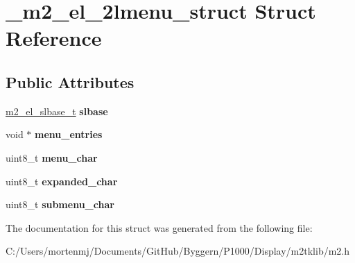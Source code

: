 \hypertarget{struct__m2__el__2lmenu__struct}{\section{\-\_\-m2\-\_\-el\-\_\-2lmenu\-\_\-struct Struct Reference}
\label{struct__m2__el__2lmenu__struct}
}
\subsection*{Public Attributes}
\begin{DoxyCompactItemize}
\item 
\hypertarget{struct__m2__el__2lmenu__struct_a7527f05edbb17b7123e9968b55d26a96}{\hyperlink{struct__m2__el__slbase__struct}{m2\-\_\-el\-\_\-slbase\-\_\-t} {\bfseries slbase}}\label{struct__m2__el__2lmenu__struct_a7527f05edbb17b7123e9968b55d26a96}

\item 
\hypertarget{struct__m2__el__2lmenu__struct_a672420cd13ced182cf71e64004835190}{void $\ast$ {\bfseries menu\-\_\-entries}}\label{struct__m2__el__2lmenu__struct_a672420cd13ced182cf71e64004835190}

\item 
\hypertarget{struct__m2__el__2lmenu__struct_a2bb9ab8547b38e3c5fcf4b228266c040}{uint8\-\_\-t {\bfseries menu\-\_\-char}}\label{struct__m2__el__2lmenu__struct_a2bb9ab8547b38e3c5fcf4b228266c040}

\item 
\hypertarget{struct__m2__el__2lmenu__struct_a315e66f67d3a53d0731a0de873a58a0d}{uint8\-\_\-t {\bfseries expanded\-\_\-char}}\label{struct__m2__el__2lmenu__struct_a315e66f67d3a53d0731a0de873a58a0d}

\item 
\hypertarget{struct__m2__el__2lmenu__struct_a5ae246bdece9e449a68cf91f986ec93f}{uint8\-\_\-t {\bfseries submenu\-\_\-char}}\label{struct__m2__el__2lmenu__struct_a5ae246bdece9e449a68cf91f986ec93f}

\end{DoxyCompactItemize}


The documentation for this struct was generated from the following file\-:\begin{DoxyCompactItemize}
\item 
C\-:/\-Users/mortenmj/\-Documents/\-Git\-Hub/\-Byggern/\-P1000/\-Display/m2tklib/m2.\-h\end{DoxyCompactItemize}

